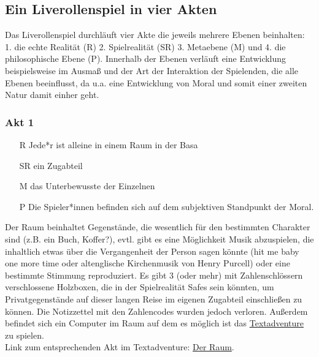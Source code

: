 \documentclass[a4paper, 12pt]{scrartcl}
\begin{document}
    \subsection{Ein Liverollenspiel in vier Akten}
    Das Liverollenspiel durchläuft vier Akte die jeweils mehrere Ebenen beinhalten: 1. die echte Realität (R) 2. Spielrealität (SR) 3. Metaebene (M) und 4. die philosophische Ebene (P). Innerhalb der Ebenen verläuft eine Entwicklung beispielsweise im Ausmaß und der Art der Interaktion der Spielenden, die alle Ebenen beeinflusst, da u.a. eine Entwicklung von Moral und somit einer zweiten Natur damit einher geht.
    \subsubsection{Akt 1}
   \begin{itemize}
   \item[R] Jede*r ist alleine in einem Raum in der Basa
   \item[SR] ein Zugabteil 
   \item[M] das Unterbewusste der Einzelnen
   \item[P] Die Spieler*innen befinden sich auf dem subjektiven Standpunkt der Moral. 
   \end{itemize}
   Der Raum beinhaltet Gegenstände, die wesentlich für den bestimmten Charakter sind (z.B. ein Buch, Koffer?), evtl. gibt es eine Möglichkeit Musik abzuspielen, die inhaltlich etwas über die Vergangenheit der Person sagen könnte (\glqq hit me baby one more time\grqq{} oder altenglische Kirchenmusik von Henry Purcell) oder eine bestimmte Stimmung reproduziert.
     Es gibt 3 (oder mehr) mit Zahlenschlössern verschlossene Holzboxen, die in der Spielrealität Safes sein könnten, um Privatgegenstände auf dieser langen Reise im eigenen Zugabteil einschließen zu können.
    Die Notizzettel mit den Zahlencodes wurden jedoch verloren.
    Außerdem befindet sich ein Computer im Raum auf dem es möglich ist das \hyperref[textadventure]{Textadventure} zu spielen.\\
    Link zum entsprechenden Akt im Textadventure: \hyperref[der-raum]{Der Raum}.
    
\end{document}
